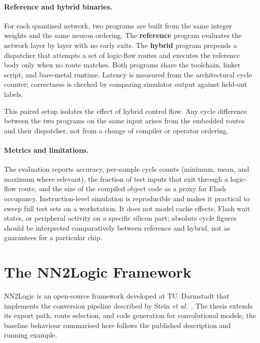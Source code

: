\paragraph{Reference and hybrid binaries.}
For each quantised network, two programs are built from the same integer weights and the same neuron ordering.
The \textbf{reference} program evaluates the network layer by layer with no early exits.
The \textbf{hybrid} program prepends a dispatcher that attempts a set of logic-flow routes and executes the reference body only when no route matches.
Both programs share the toolchain, linker script, and bare-metal runtime.
Latency is measured from the architectural cycle counter; correctness is checked by comparing simulator output against held-out labels.

This paired setup isolates the effect of hybrid control flow.
Any cycle difference between the two programs on the same input arises from the embedded routes and their dispatcher, not from a change of compiler or operator ordering.

\paragraph{Metrics and limitations.}
The evaluation reports accuracy, per-sample cycle counts (minimum, mean, and maximum where relevant), the fraction of test inputs that exit through a logic-flow route, and the size of the compiled object code as a proxy for Flash occupancy.
Instruction-level simulation is reproducible and makes it practical to sweep full test sets on a workstation.
It does not model cache effects, Flash wait states, or peripheral activity on a specific silicon part; absolute cycle figures should be interpreted comparatively between reference and hybrid, not as guarantees for a particular chip.


\section{The NN2Logic Framework}
\label{sec:bg-nn2logic}

NN2Logic is an open-source framework developed at TU~Darmstadt that implements the conversion pipeline described by Stein \textit{et al.}~\cite{stein2026nn2logic}.
The thesis extends its export path, route selection, and code generation for convolutional models; the baseline behaviour summarised here follows the published description and running example.

